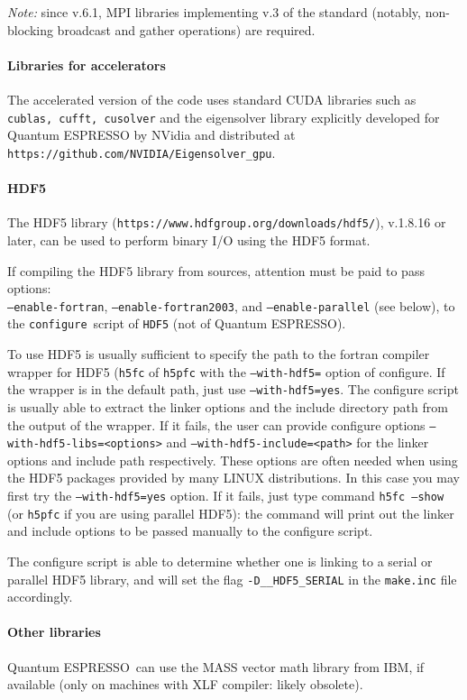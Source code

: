 \documentclass[12pt,a4paper]{article}
\def\qe{{\sc Quantum ESPRESSO}}
\def\configure{\texttt{configure}}
\begin{document}
{\em Note:} since v.6.1, MPI libraries implementing v.3 of the standard
(notably, non-blocking broadcast and gather operations) are required.

\paragraph{Libraries for accelerators}
The accelerated version of the code uses standard CUDA libraries such as
\texttt{cublas, cufft, cusolver} and the eigensolver library explicitly
developed for \qe{} by NVidia and distributed at \texttt{https://github.com/NVIDIA/Eigensolver\_gpu}.

\paragraph {HDF5}
The HDF5 library (\texttt{https://www.hdfgroup.org/downloads/hdf5/}),
v.1.8.16 or later, can be used to perform binary I/O using the HDF5
format.

If compiling the HDF5 library from sources, attention must be paid
to pass options:\\
\texttt{--enable-fortran}, \texttt{--enable-fortran2003}, and 
\texttt{--enable-parallel} (see below),
to the \configure{}ript of \texttt{HDF5} (not of \qe).

To use HDF5 is usually sufficient to specify the path to the fortran
compiler wrapper for HDF5 (\texttt{h5fc} of \texttt{h5pfc} with the
\texttt{--with-hdf5=} option of configure. If the wrapper is in the
default path, just use \texttt{--with-hdf5=yes}.
The configure script is usually able to extract the linker options
and the include directory path from the output of the wrapper. If it
fails, the user can provide configure options
\texttt{--with-hdf5-libs=<options>} and \texttt{--with-hdf5-include=<path>}
for the linker options and include path respectively.
These options are often needed when using the HDF5 packages
provided by many LINUX distributions. In this case you may first try
the \texttt{--with-hdf5=yes} option. If it fails, just type command
\texttt{h5fc --show} (or \texttt{h5pfc} if you are using parallel HDF5):
the command will print out the linker and include options to be passed
manually to the configure script.

The configure script is able to determine whether one is linking to a
serial or parallel HDF5 library, and will  set the flag
\texttt{-D\_\_HDF5\_SERIAL} in the \texttt{make.inc} file accordingly.


\paragraph{Other libraries}
\qe\ can use the MASS vector math
library from IBM, if available (only on machines with XLF compiler:
likely obsolete).
\end{document}
